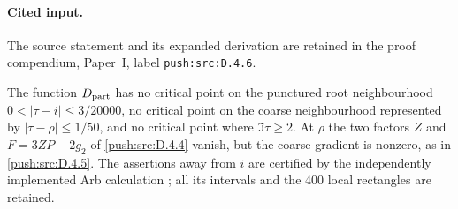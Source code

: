 \paragraph{Cited input.} \label{push:src:D.4.6}The source statement and its expanded derivation are retained in the proof compendium, Paper~I, label \nolinkurl{push:src:D.4.6}.\par



\begin{proposition}\label{push:src:D.4.7}
The function $D_{\rm part}$ has no critical point on the punctured
root neighbourhood $0<|\tau-i|\leq3/20000$, no critical point on the
coarse neighbourhood represented by $|\tau-\rho|\leq1/50$, and no
critical point where $\Im\tau\geq2$. At $\rho$ the two factors
$Z$ and $F=3ZP-2g_2$ of \ref{push:src:D.4.4} vanish, but the coarse gradient is
nonzero, as in \ref{push:src:D.4.5}. The assertions away from $i$ are certified by
the independently implemented Arb calculation
; all its intervals and
the 400 local rectangles are retained.
\end{proposition}


